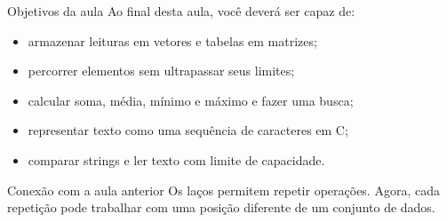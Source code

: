 \begin{frame}{Objetivos da aula}
Ao final desta aula, você deverá ser capaz de:
\begin{itemize}
\item armazenar leituras em vetores e tabelas em matrizes;
\item percorrer elementos sem ultrapassar seus limites;
\item calcular soma, média, mínimo e máximo e fazer uma busca;
\item representar texto como uma sequência de caracteres em C;
\item comparar strings e ler texto com limite de capacidade.
\end{itemize}
\begin{block}{Conexão com a aula anterior}
Os laços permitem repetir operações. Agora, cada repetição pode trabalhar com uma posição diferente de um conjunto de dados.
\end{block}
\end{frame}

